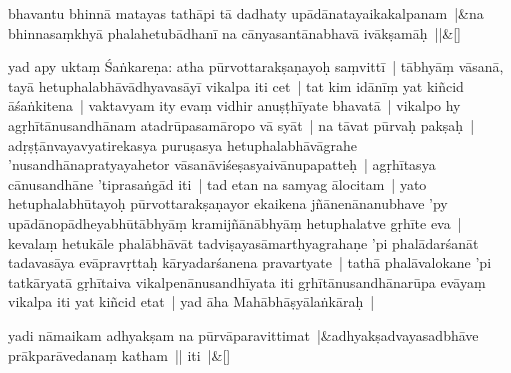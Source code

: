 \documentclass[article,12pt,a4paper]{memoir}%
\newcommand{\persName}[1]{#1}
\newcounter{parCount}
\begin{document}
	{}
	\pend%
      
	    
	    \stanza[\smallbreak]
	  bhavantu bhinnā matayas tathāpi tā dadhaty upādānatayaikakalpanam |&na bhinnasaṃkhyā phalahetubādhanī na cānyasantānabhavā ivākṣamāḥ ||\&[\smallbreak]
	  
	  
	  

	  \pstart \leavevmode%
	\label{thakur75-126.29}yad apy uktaṃ \persName{Śaṅkareṇa}: atha pūrvottarakṣaṇayoḥ saṃvittī | tābhyāṃ vāsanā, tayā hetuphalabhāvādhyavasāyī vikalpa iti cet | \label{thakur75-126.30} tat kim idānīṃ yat kiñcid āśaṅkitena | vaktavyam ity evaṃ vidhir anuṣṭhīyate bhavatā | vikalpo hy agṛhītānusandhānam atadrūpasamāropo vā syāt | \label{thakur75-126.32} na tāvat pūrvaḥ pakṣaḥ | adṛṣṭānvayavyatirekasya puruṣasya hetuphalabhāvāgrahe 'nusandhānapratyayahetor vāsanāviśeṣasyaivānupapatteḥ | agṛhītasya cānusandhāne 'tiprasaṅgād iti | \label{thakur75-127.1} tad etan na samyag ālocitam | yato hetuphalabhūtayoḥ pūrvottarakṣaṇayor ekaikena jñānenānanubhave 'py upādānopādheyabhūtābhyāṃ kramijñānābhyāṃ hetuphalatve gṛhīte eva | kevalaṃ hetukāle phalābhāvāt tadviṣayasāmarthyagrahaṇe 'pi phalādarśanāt tadavasāya evāpravṛttaḥ kāryadarśanena pravartyate | tathā phalāvalokane 'pi tatkāryatā gṛhītaiva vikalpenānusandhīyata iti gṛhītānusandhānarūpa evāyaṃ vikalpa iti yat kiñcid etat | \label{thakur75-127.7} yad āha Mahābhāṣyālaṅkāraḥ |
	{}
	\pend%
      
	    
	    \stanza[\smallbreak]
	  \label{ratnakīrtinibandhāvali__lg__yadi_nāmaikam2}yadi nāmaikam adhyakṣam na pūrvāparavittimat |&adhyakṣadvayasadbhāve prākparāvedanaṃ katham || iti |\&[\smallbreak]
	  
	  
	  
\end{document}
